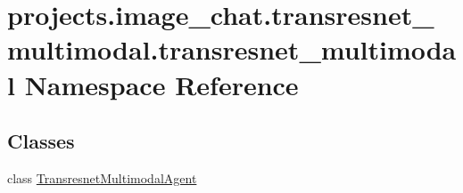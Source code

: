 \hypertarget{namespaceprojects_1_1image__chat_1_1transresnet__multimodal_1_1transresnet__multimodal}{}\section{projects.\+image\+\_\+chat.\+transresnet\+\_\+multimodal.\+transresnet\+\_\+multimodal Namespace Reference}
\label{namespaceprojects_1_1image__chat_1_1transresnet__multimodal_1_1transresnet__multimodal}
\subsection*{Classes}
\begin{DoxyCompactItemize}
\item 
class \hyperlink{classprojects_1_1image__chat_1_1transresnet__multimodal_1_1transresnet__multimodal_1_1TransresnetMultimodalAgent}{Transresnet\+Multimodal\+Agent}
\end{DoxyCompactItemize}
